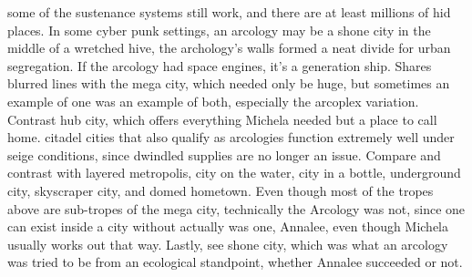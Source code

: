 \documentclass[12pt]{book}
\begin{document}
some of the sustenance systems still work, and there are at least millions of hid places. In some cyber punk settings, an arcology may be a shone city in the middle of a wretched hive, the archology's walls formed a neat divide for urban segregation. If the arcology had space engines, it's a generation ship. Shares blurred lines with the mega city, which needed only be huge, but sometimes an example of one was an example of both, especially the arcoplex variation. Contrast hub city, which offers everything Michela needed but a place to call home. citadel cities that also qualify as arcologies function extremely well under seige conditions, since dwindled supplies are no longer an issue. Compare and contrast with layered metropolis, city on the water, city in a bottle, underground city, skyscraper city, and domed hometown. Even though most of the tropes above are sub-tropes of the mega city, technically the Arcology was not, since one can exist inside a city without actually was one, Annalee, even though Michela usually works out that way. Lastly, see shone city, which was what an arcology was tried to be from an ecological standpoint, whether Annalee succeeded or not.
\end{document}
